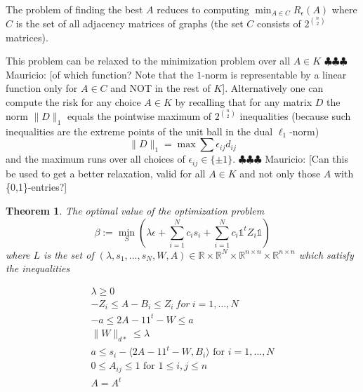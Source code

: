 \documentclass[12pt]{amsart}
\newtheorem{theorem}[lemma]{Theorem}
\numberwithin{equation}{section}
\newcommand{\RR}{\mathbb{R}}
\newcommand{\mv}[1]{{\color{red} \sf $\clubsuit\clubsuit\clubsuit$ Mauricio: [#1]}}
\newcommand{\ddr}[1]{{\color{blue} \sf $\clubsuit\clubsuit\clubsuit$ Daniel: [#1]}}
\begin{document}

The problem of finding the best $A$ reduces to computing $\min_{A\in C} R_{\epsilon}(A)$ where $C$ is the set of all adjacency matrices of graphs (the set $C$ consists of $2^{\binom{n}{2}}$ matrices). 

This problem can be relaxed to the minimization problem over all $A\in K$ \mv{of which function? Note that the $1$-norm is representable by a linear function only for $A\in C$ and NOT in the rest of $K$}. Alternatively one can compute the risk for any choice $A\in K$ by recalling that for any matrix $D$ the norm $\|D\|_1$ equals the pointwise maximum of $2^{\binom{n}{2}}$ inequalities (because such inequalities are the extreme points of the unit ball in the dual $\ell_1$-norm)
\[\|D\|_1=\max \sum \epsilon_{ij}d_{ij}\]
and the maximum runs over all choices of $\epsilon_{ij}\in\{\pm 1\}$.
\mv{Can this be used to get a better relaxation, valid for all $A\in K$ and not only those $A$ with \{0,1\}-entries?}



\begin{theorem} 
The optimal value of the optimization problem
\[\beta:=\min_S \left(\lambda\epsilon +\sum_{i=1}^N c_is_i+\sum_{i=1}^Nc_i\mathds{1}^tZ_i\mathds{1}\right)\]
where $L$ is the set of $(\lambda, s_1,\dots, s_N, W,A)\in \RR\times\RR^N\times \RR^{n\times n}\times \RR^{n\times n}$ which satisfy the inequalities
\begin{center}
\[
\begin{array}{l}
\lambda \geq 0\\
-Z_i \leq A-B_i \leq Z_i \ for \ i=1,\dots, N \\
-a \leq 2A-11^t-W \leq a \\
\|W\|_{d*}\leq \lambda\\
a\leq s_i-\langle 2A-11^t-W, B_i\rangle\text{ for $i=1,\dots, N$}\\
0\leq A_{ij}\leq 1 \text{ for  $1\leq i,j\leq n$} \\
A = A^t
\end{array}
\]

\end{center}


\end{theorem}
\end{document}
